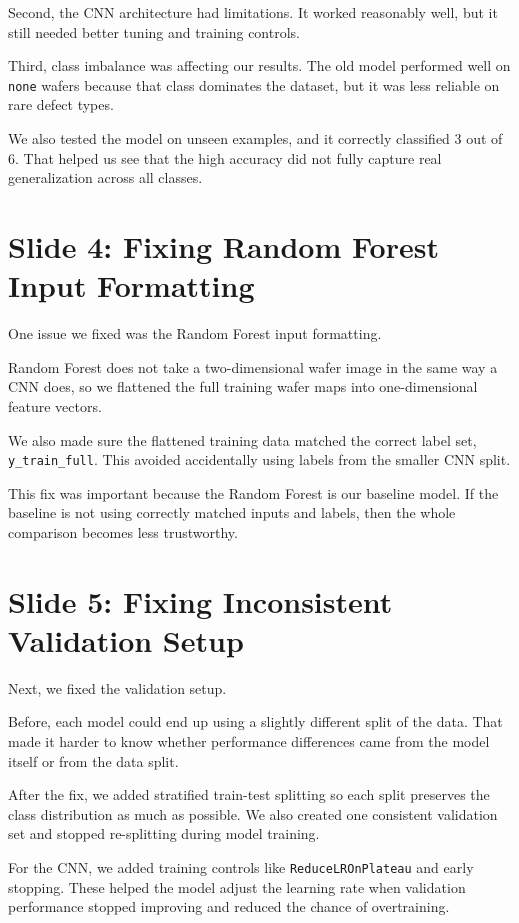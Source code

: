 \documentclass[11pt]{article}
\begin{document}
Second, the CNN architecture had limitations. It worked reasonably well, but it still needed better tuning and training controls.

Third, class imbalance was affecting our results. The old model performed well on \texttt{none} wafers because that class dominates the dataset, but it was less reliable on rare defect types.

We also tested the model on unseen examples, and it correctly classified 3 out of 6. That helped us see that the high accuracy did not fully capture real generalization across all classes.

\section*{Slide 4: Fixing Random Forest Input Formatting}

One issue we fixed was the Random Forest input formatting.

Random Forest does not take a two-dimensional wafer image in the same way a CNN does, so we flattened the full training wafer maps into one-dimensional feature vectors.

We also made sure the flattened training data matched the correct label set, \texttt{y\_train\_full}. This avoided accidentally using labels from the smaller CNN split.

This fix was important because the Random Forest is our baseline model. If the baseline is not using correctly matched inputs and labels, then the whole comparison becomes less trustworthy.

\section*{Slide 5: Fixing Inconsistent Validation Setup}

Next, we fixed the validation setup.

Before, each model could end up using a slightly different split of the data. That made it harder to know whether performance differences came from the model itself or from the data split.

After the fix, we added stratified train-test splitting so each split preserves the class distribution as much as possible. We also created one consistent validation set and stopped re-splitting during model training.

For the CNN, we added training controls like \texttt{ReduceLROnPlateau} and early stopping. These helped the model adjust the learning rate when validation performance stopped improving and reduced the chance of overtraining.
\end{document}
